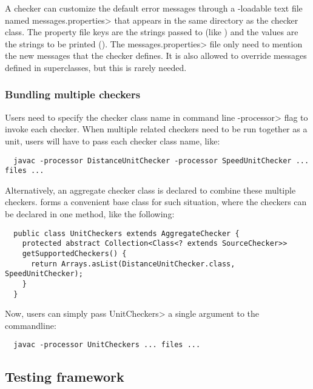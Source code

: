 A checker can customize the default error messages through a
-loadable text file named
\<messages.properties> that appears in the same directory as the checker class.
The property file keys are the strings passed to 
(like ) and the values are the strings to be
printed ().
The \<messages.properties> file only need to mention the new messages that
the checker defines.
It is also allowed to override messages defined in superclasses, but this
is rarely needed.

\subsubsection{Bundling multiple checkers}


Users need to specify the checker class name in command line
\<-processor> flag to invoke each checker.  When multiple related
checkers need to be run together as a unit, users will have to pass
each checker class name, like:

\begin{Verbatim}
  javac -processor DistanceUnitChecker -processor SpeedUnitChecker ... files ...
\end{Verbatim}

Alternatively, an aggregate checker class is declared to combine these
multiple checkers.   forms a
convenient base class for such situation, where the checkers can be
declared in one method, like the following:

\begin{Verbatim}
  public class UnitCheckers extends AggregateChecker {
    protected abstract Collection<Class<? extends SourceChecker>>
    getSupportedCheckers() {
      return Arrays.asList(DistanceUnitChecker.class, SpeedUnitChecker);
    }
  }
\end{Verbatim}

Now, users can simply pass \<UnitCheckers> a single argument to the commandline:

\begin{Verbatim}
  javac -processor UnitCheckers ... files ...
\end{Verbatim}

\subsection{Testing framework}

